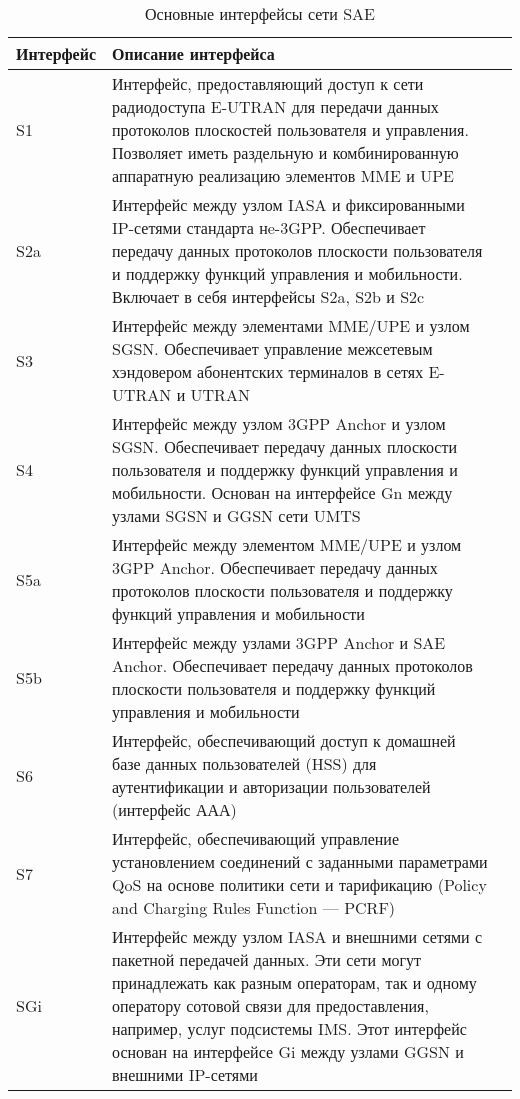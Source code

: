\begin{table} [htbp]
  \centering
  \parbox{15cm}{\caption{Основные интерфейсы сети SAE}\label{SAEinterface}}
  \begin{tabular}[t]{| p{3cm} || p{12cm}l |}
  \hline
  \hline
  Интерфейс & \centering  Описание интерфейса & \\
  \hline
  \hline
  S1 & \centering  Интерфейс, предоставляющий доступ к сети радиодоступа E-UTRAN для передачи данных протоколов плоскостей пользователя и управления. Позволяет иметь раздельную и комбинированную аппаратную реализацию элементов MME и UPE & \\
  \hline
  S2a & \centering Интерфейс между узлом IASA и фиксированными IP-сетями стандарта нe-3GPP. Обеспечивает передачу данных протоколов плоскости пользователя и поддержку функций управления и мобильности. Включает в себя интерфейсы S2a, S2b и S2c & \\
  \hline
  S3 & \centering Интерфейс между элементами MME/UPE и узлом SGSN. Обеспечивает управление межсетевым хэндовером абонентских терминалов в сетях E-UTRAN и UTRAN  & \\
  \hline
  S4 & \centering Интерфейс между узлом 3GPP Anchor и узлом SGSN. Обеспечивает передачу данных плоскости пользователя и поддержку функций управления и мобильности. Основан на интерфейсе Gn между узлами SGSN и GGSN сети UMTS  & \\
  \hline
  S5a & \centering Интерфейс между элементом MME/UPE и узлом 3GPP Anchor. Обеспечивает передачу данных протоколов плоскости пользователя и поддержку функций управления и мобильности  & \\
  \hline
  S5b & \centering Интерфейс между узлами 3GPP Anchor и SAE Anchor. Обеспечивает передачу данных протоколов плоскости пользователя и поддержку функций управления и мобильности   & \\
  \hline
  S6 & \centering Интерфейс, обеспечивающий доступ к домашней базе данных пользователей (HSS) для аутентификации и авторизации пользователей (интерфейс ААА) & \\
  \hline
  S7 & \centering Интерфейс, обеспечивающий управление установлением соединений с заданными параметрами QoS на основе политики сети и тарификацию (Policy and Charging Rules Function — PCRF)    & \\
  \hline
  SGi & \centering Интерфейс между узлом IASA и внешними сетями с пакетной передачей данных. Эти сети могут принадлежать как разным операторам, так и одному оператору сотовой связи для предоставления, например, услуг подсистемы IMS. Этот интерфейс основан на интерфейсе Gi между узлами GGSN и внешними IP-сетями  & \\
  \hline
  \hline
  \end{tabular}
\end{table}




